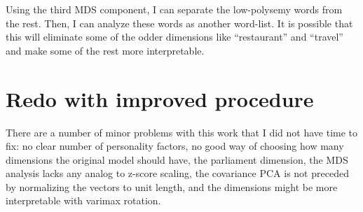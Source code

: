 \documentclass[eric_thesis.tex]{subfiles}
\begin{document}
Using the third MDS component, I can separate the low-polysemy words from the 
rest. Then, I can analyze these words as another word-list. It is possible
that this will eliminate some of the odder dimensions like ``restaurant'' and
``travel'' and make some of the rest more interpretable.

\section{Redo with improved procedure}

There are a number of minor problems with this work that I did not have time to
fix: no clear number of personality factors, no good way of choosing how many 
dimensions the original model should have, the parliament dimension, the 
MDS analysis lacks any analog to z-score scaling, the covariance PCA is not
preceded by normalizing the vectors to unit length, and the dimensions might
be more interpretable with varimax rotation.
\end{document}
